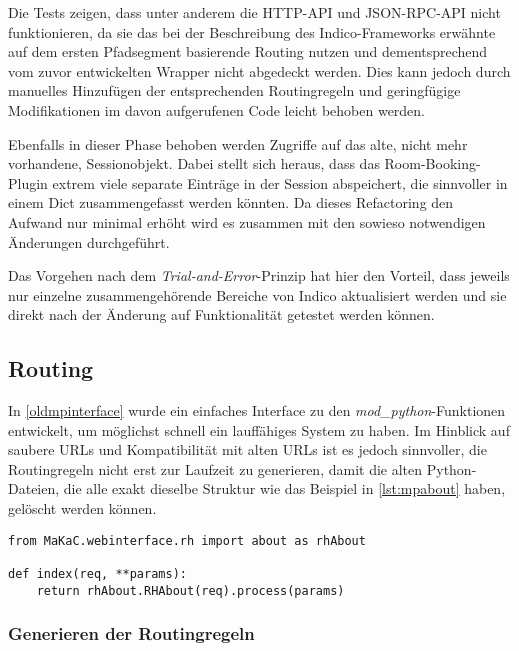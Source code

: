 Die Tests zeigen, dass unter anderem die HTTP-API und JSON-RPC-API nicht funktionieren, da sie das
bei der Beschreibung des Indico-Frameworks erwähnte auf dem ersten Pfadsegment basierende Routing
nutzen und dementsprechend vom zuvor entwickelten Wrapper nicht abgedeckt werden. Dies kann jedoch
durch manuelles Hinzufügen der entsprechenden Routingregeln und geringfügige Modifikationen im davon
aufgerufenen Code leicht behoben werden.

Ebenfalls in dieser Phase behoben werden Zugriffe auf das alte, nicht mehr vorhandene,
Sessionobjekt. Dabei stellt sich heraus, dass das Room-Booking-Plugin extrem viele separate
Einträge in der Session abspeichert, die sinnvoller in einem Dict zusammengefasst werden könnten. Da
dieses Refactoring den Aufwand nur minimal erhöht wird es zusammen mit den sowieso notwendigen
Änderungen durchgeführt.

Das Vorgehen nach dem \emph{Trial-and-Error}-Prinzip hat hier den Vorteil, dass jeweils nur einzelne
zusammengehörende Bereiche von Indico aktualisiert werden und sie direkt nach der Änderung auf
Funktionalität getestet werden können.


\subsection{Routing}

In \autoref{oldmpinterface} wurde ein einfaches Interface zu den \emph{mod\_python}-Funktionen
entwickelt, um möglichst schnell ein lauffähiges System zu haben. Im Hinblick auf saubere URLs und
Kompatibilität mit alten URLs ist es jedoch sinnvoller, die Routingregeln nicht erst zur Laufzeit zu
generieren, damit die alten Python-Dateien, die alle exakt dieselbe Struktur wie das Beispiel in
\autoref{lst:mpabout} haben, gelöscht werden können.

\begin{lstlisting}[caption=about.py im htdocs-Verzeichnis,label=lst:mpabout]
from MaKaC.webinterface.rh import about as rhAbout

def index(req, **params):
    return rhAbout.RHAbout(req).process(params)
\end{lstlisting}


\subsubsection{Generieren der Routingregeln}\label{routingrulegen}


